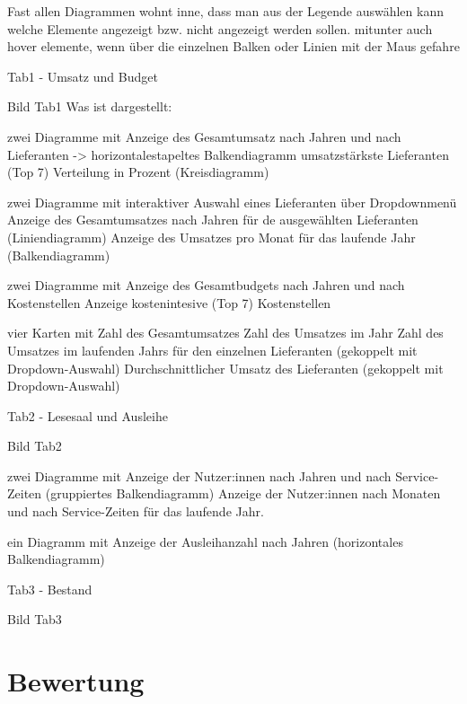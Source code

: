     Fast allen Diagrammen wohnt inne, dass man aus der Legende auswählen kann welche Elemente angezeigt bzw. nicht angezeigt werden sollen.
    mitunter auch hover elemente, wenn über die einzelnen Balken oder Linien mit der Maus gefahre 
    
    Tab1 - Umsatz und Budget
    
    Bild Tab1
    Was ist dargestellt:
    
    zwei Diagramme mit 
        Anzeige des Gesamtumsatz nach Jahren und nach Lieferanten ->  horizontalestapeltes Balkendiagramm
        umsatzstärkste Lieferanten (Top 7) Verteilung in Prozent (Kreisdiagramm)
        
    zwei Diagramme mit interaktiver Auswahl eines Lieferanten über Dropdownmenü
        Anzeige des Gesamtumsatzes nach Jahren für de ausgewählten Lieferanten (Liniendiagramm)
        Anzeige des Umsatzes pro Monat für das laufende Jahr (Balkendiagramm)
    
    zwei Diagramme mit
        Anzeige des Gesamtbudgets nach Jahren und nach Kostenstellen 
        Anzeige kostenintesive (Top 7) Kostenstellen
        
    
    vier Karten mit
        Zahl des Gesamtumsatzes
        Zahl des Umsatzes im Jahr
        Zahl des Umsatzes im laufenden Jahrs für den einzelnen Lieferanten (gekoppelt mit Dropdown-Auswahl)
        Durchschnittlicher Umsatz des Lieferanten (gekoppelt mit Dropdown-Auswahl)
    
    
    
    
    
    Tab2 - Lesesaal und Ausleihe
    
    Bild Tab2
    
    zwei Diagramme mit
        Anzeige der Nutzer:innen nach Jahren und nach Service-Zeiten (gruppiertes Balkendiagramm)
        Anzeige der Nutzer:innen nach Monaten und nach Service-Zeiten für das laufende Jahr.
        
     ein Diagramm mit
        Anzeige der Ausleihanzahl nach Jahren (horizontales Balkendiagramm)
    
    Tab3 - Bestand
    
    Bild Tab3

    
     



\section{Bewertung}

